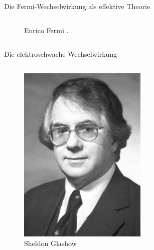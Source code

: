 \documentclass[aspectratio=1610, professionalfonts, 10pt]{beamer}
\begin{document}
\begin{frame}{Die Fermi-Wechselwirkung als effektive Theorie}
\begin{columns}
\begin{figure}
	  			\caption{Enrico Fermi \cite{wiki:fermi}.}
	  			\label{fig:fermi}
			\end{figure}
	\end{columns}
\end{frame}

\begin{frame}{Die elektroschwache Wechselwirkung}
	\begin{columns}
			\begin{figure}
	  			\centering
				\includegraphics[width=\linewidth]{Images/glashow-13318-content-portrait-mobile-tiny.jpg}
	  			\caption{Sheldon Glashow}
	  			\label{fig:fermi}
			\end{figure}
			\begin{figure}
	  			\centering

\end{figure}
\end{columns}
\end{frame}
\end{document}
